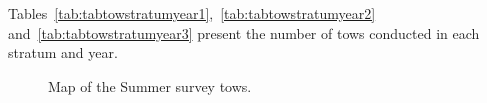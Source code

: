\documentclass[12pt]{article}\usepackage[]{graphicx}\usepackage[]{color}
\begin{document}
Tables~\ref{tab:tabtowstratumyear1},~\ref{tab:tabtowstratumyear2} and~\ref{tab:tabtowstratumyear3} present the number of tows conducted in each stratum and year.


\begin{figure}[htb]

{\centering {} 

}

\caption{Map of the Summer survey tows.}\label{fig:map3}
\end{figure}
\end{document}
